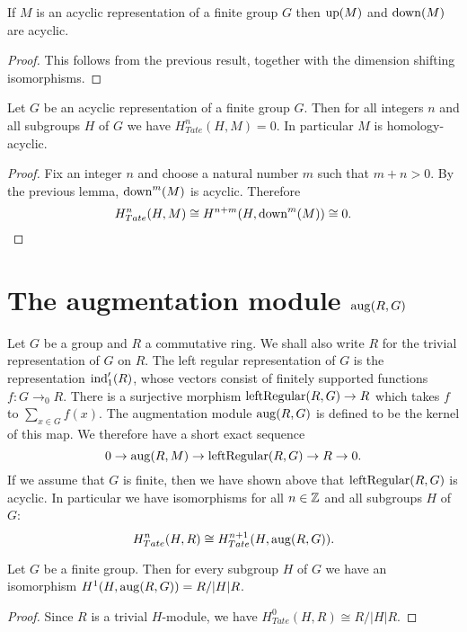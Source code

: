 \begin{lemma}
	If $M$ is an acyclic representation of a finite group $G$ then $\mathrm{up}(M)$ and $\mathrm{down}(M)$ are acyclic.
\end{lemma}

\begin{proof}
	This follows from the previous result, together with the dimension shifting isomorphisms.
\end{proof}

\begin{theorem}
	Let $G$ be an acyclic representation of a finite group $G$.
	Then for all integers $n$ and all subgroups $H$ of $G$ we have $H^n_{Tate}(H,M)=0$.
	In particular $M$ is homology-acyclic.
\end{theorem}

\begin{proof}
	Fix an integer $n$ and choose a natural number $m$ such that $m + n > 0$.
	By the previous lemma, $\mathrm{down}^m(M)$ is acyclic.
	Therefore
	\[
		H^n_{Tate}(H,M) \cong H^{n+m}(H, \mathrm{down}^m(M)) \cong 0.
	\]
\end{proof}



\section{The augmentation module $\mathrm{aug}(R,G)$}

Let $G$ be a group and $R$ a commutative ring. We shall also write $R$ for the trivial
representation of $G$ on $R$.
The left regular representation of $G$ is the representation $\mathrm{ind}_1'(R)$, whose
vectors consist of finitely supported functions $f : G \to_0 R$.
There is a surjective morphism $\mathrm{leftRegular}(R,G) \to R$ which takes $f$ to $\sum_{x \in G} f(x)$.
The augmentation module $\mathrm{aug}(R,G)$ is defined to be the kernel of this map.
We therefore have a short exact sequence
\[
	0 \to \mathrm{aug}(R,M) \to \mathrm{leftRegular}(R,G) \to R \to 0.
\]
If we assume that $G$ is finite, then we have shown above that $\mathrm{leftRegular}(R,G)$ is acyclic.
In particular we have isomorphisms for all $n \in {\mathbb Z}$ and all subgroups $H$ of $G$:
\[
	H^n_{Tate}(H,R) \cong H^{n+1}_{Tate}(H,\mathrm{aug}(R,G)).
\]


\begin{lemma}
	Let $G$ be a finite group.
	Then for every subgroup $H$ of $G$ we have an isomorphism $H^1(H,\mathrm{aug}(R,G)) = R / |H| R$.
\end{lemma}

\begin{proof}
	Since $R$ is a trivial $H$-module, we have $H^0_{Tate}(H,R) \cong R / |H| R$.
\end{proof}



